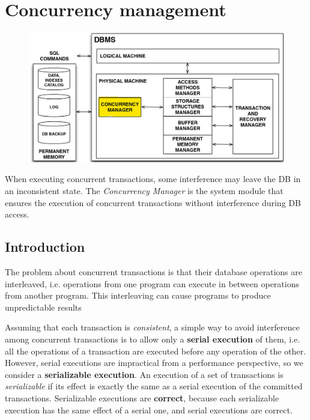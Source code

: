\section{Concurrency management}

\begin{figure}[h!]
		\centering
		\includegraphics[scale = 0.7]{img/conc1.jpg}
		\label{tr10}
\end{figure}

When executing concurrent transactions, some interference may leave the DB in an inconsistent state. The \textit{Concurrency Manager} is the system module that ensures the execution of concurrent transactions without interference during DB access.

\subsection{Introduction}
The problem about concurrent transactions is that their database operations are interleaved, i.e. operations from one program can execute in between operations from another program. This interleaving can cause programs to produce unpredictable results

Assuming that each transaction is \textit{consistent}, a simple way to avoid interference among concurrent transactions is to allow only a \textbf{serial execution}  of them, i.e. all the operations of a transaction are executed before any operation of the other. However, serial executions are impractical from a performance perspective, so we consider a \textbf{serializable execution}. An execution of a set of transactions is \textit{serializable} if its effect is exactly the same as a serial execution of the committed transactions. Serializable executions are \textbf{correct}, because each serializable execution has the same effect of a serial one, and serial executions are correct.

